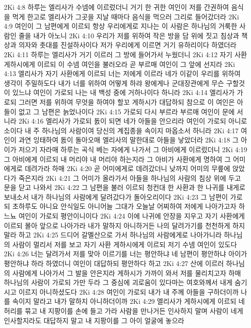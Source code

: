2Ki 4:8  하루는 엘리사가 수넴에 이르렀더니 거기 한 귀한 여인이 저를 간권하여 음식을 먹게 한고로 엘리사가 그곳을 지날 때마다 음식을 먹으러 그리로 들어갔더라
2Ki 4:9  여인이 그 남편에게 이르되 항상 우리에게로 지나는 이 사람은 하나님의 거룩한 사람인 줄을 내가 아노니
2Ki 4:10  우리가 저를 위하여 작은 방을 담 위에 짓고 침상과 책상과 의자와 촛대를 진설하사이다 저가 우리에게 이르면 거기 유하리이다 하였더라
2Ki 4:11  하루는 엘리사가 거기 이르러 그 방에 들어가서 누웠더니
2Ki 4:12  자기 사환 게하시에게 이르되 이 수넴 여인을 불러오라 곧 부르매 여인이 그 앞에 선지라
2Ki 4:13  엘리사가 자기 사환에게 이르되 너는 저에게 이르라 네가 이같이 우리를 위하여 생각이 주밀하도다 내가 너를 위하여 어떻게 하랴 왕에게나 군대장관에게 무슨 구할것이 있느냐 여인이 가로되 나는 내 백성 중에 거하나이다 하니라
2Ki 4:14  엘리사가 가로되 그러면 저를 위하여 무엇을 하여야 할꼬 게하시가 대답하되 참으로 이 여인은 아들이 없고 그 남편은 늙었나이다
2Ki 4:15  가로되 다시 부르라 부르매 여인이 문에 서니라
2Ki 4:16  엘리사가 가로되 돐이 되면 네가 아들을 안으리라 여인이 가로되 아니로소이다 내 주 하나님의 사람이여 당신의 계집종을 속이지 마옵소서 하니라
2Ki 4:17  여인이 과연 잉태하여 돐이 돌아오매 엘리사의 말한대로 아들을 낳았더라
2Ki 4:18  그 아이가 저으기 자라매 하루는 곡식 베는 자에게 나가서 그 아비에게 이르렀더니
2Ki 4:19  그 아비에게 이르되 내 머리야 내 머리야 하는지라 그 아비가 사환에게 명하여 그 어미에게로 데려가라 하매
2Ki 4:20  곧 어미에게로 데려갔더니 낮까지 어미의 무릎에 앉았다가 죽은지라
2Ki 4:21  그 어미가 올라가서 아들을 하나님의 사람의 침상 위에 두고 문을 닫고 나와서
2Ki 4:22  그 남편을 불러 이르되 청컨대 한 사환과 한 나귀를 내게로 보내소서 내가 하나님의 사람에게 달려갔다가 돌아오리이다
2Ki 4:23  그 남편이 가로되 초하루도 아니요 안식일도 아니어늘 그대가 오늘날 어찌하여 저에게 나아가고자 하느뇨 여인이 가로되 평안이니이다
2Ki 4:24  이에 나귀에 안장을 지우고 자기 사환에게 이르되 몰아 앞으로 나아가라 내가 말하지 아니하거든 나의 달려가기를 천천하게 하지 말라 하고
2Ki 4:25  드디어 갈멜산으로 가서 하나님의 사람에게로 나아가니라 하나님의 사람이 멀리서 저를 보고 자기 사환 게하시에게 이르되 저기 수넴 여인이 있도다
2Ki 4:26  너는 달려가서 저를 맞아 이르기를 너는 평안하냐 네 남편이 평안하냐 아이가 평안하냐 하라 하였더니 여인이 대답하되 평안하다 하고
2Ki 4:27  산에 이르러 하나님의 사람에게 나아가서 그 발을 안은지라 게하시가 가까이 와서 저를 물리치고자 하매 하나님의 사람이 가로되 가만 두라 그 중심에 괴로움이 있다마는 여호와께서 내게 숨기시고 이르지 아니하셨도다
2Ki 4:28  여인이 가로되 내가 내 주께 아들을 구하더이까 나를 속이지 말라고 내가 말하지 아니하더이까
2Ki 4:29  엘리사가 게하시에게 이르되 네 허리를 묶고 내 지팡이를 손에 들고 가라 사람을 만나거든 인사하지 말며 사람이 네게 인사할지라도 대답하지 말고 내 지팡이를 그 아이 얼굴에 놓으라
